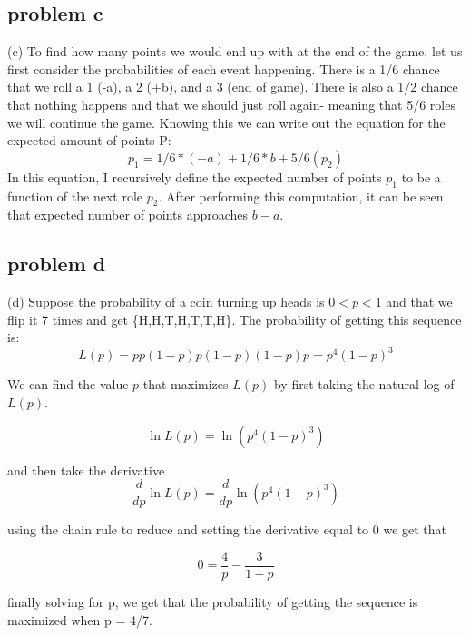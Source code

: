 \documentclass{article}
\begin{document}
\subsection{problem c}

(c) To find how many points we would end up with at the end of the game, let us first consider the probabilities of each event happening. There is a 1/6 chance that we roll a 1 (-a), a 2 (+b), and a 3 (end of game). There is also a 1/2 chance that nothing happens and that we should just roll again- meaning that 5/6 roles we will continue the game. Knowing this we can write out the equation for the expected amount of points P:
\begin{equation}
  p_{1} = 1/6 * (-a) + 1/6 * b + 5/6(p_{2})
\end{equation}
In this equation, I recursively define the expected number of points $p_1$ to be a function of the next role $p_2$. After performing this computation, it can be seen that expected number of points approaches $b - a$.

\subsection{problem d}

(d) Suppose the probability of a coin turning up heads is $0 < p < 1$ and that we flip it 7 times and get \{H,H,T,H,T,T,H\}. The probability of getting this sequence is:
\begin{equation}
  L(p) = pp(1 - p)p(1 - p)(1 - p)p = p^4(1-p)^3
\end{equation}

We can find the value $p$ that maximizes $L(p)$ by first taking the natural log of $L(p)$.

\begin{equation}
  \ln L(p) = \ln (p^4(1-p)^3)
\end{equation}

and then take the derivative
\begin{equation}
  \frac{d}{dp} \ln L(p) = \frac{d}{dp} \ln (p^4(1-p)^3)
\end{equation}

using the chain rule to reduce and setting the derivative equal to 0 we get that

\begin{equation}
  0 = \frac{4}{p} - \frac{3}{1-p}
\end{equation}

finally solving for p, we get that the probability of getting the sequence is maximized when p = 4/7.
\end{document}
